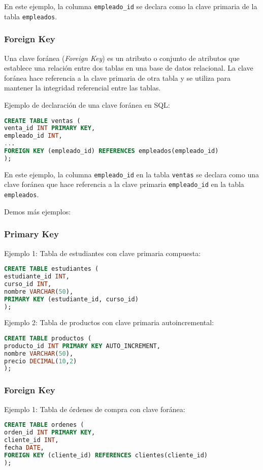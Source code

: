 \documentclass[executivepaper]{article}
\begin{document}
En este ejemplo, la columna \texttt{empleado\_id} se declara como la clave primaria de la tabla \texttt{empleados}.

\subsubsection*{Foreign Key}

Una clave foránea (\textit{Foreign Key}) es un atributo o conjunto de atributos que establece una relación entre dos tablas en una base de datos relacional. La clave foránea hace referencia a la clave primaria de otra tabla y se utiliza para mantener la integridad referencial entre las tablas.

Ejemplo de declaración de una clave foránea en SQL:

\begin{lstlisting}[language=SQL]
CREATE TABLE ventas (
venta_id INT PRIMARY KEY,
empleado_id INT,
...
FOREIGN KEY (empleado_id) REFERENCES empleados(empleado_id)
);
\end{lstlisting}

En este ejemplo, la columna \texttt{empleado\_id} en la tabla \texttt{ventas} se declara como una clave foránea que hace referencia a la clave primaria \texttt{empleado\_id} en la tabla \texttt{empleados}.

Demos más ejemplos:

\subsubsection*{Primary Key}

Ejemplo 1: Tabla de estudiantes con clave primaria compuesta:
\begin{lstlisting}[language=SQL]
CREATE TABLE estudiantes (
estudiante_id INT,
curso_id INT,
nombre VARCHAR(50),
PRIMARY KEY (estudiante_id, curso_id)
);
\end{lstlisting}

Ejemplo 2: Tabla de productos con clave primaria autoincremental:
\begin{lstlisting}[language=SQL]
CREATE TABLE productos (
producto_id INT PRIMARY KEY AUTO_INCREMENT,
nombre VARCHAR(50),
precio DECIMAL(10,2)
);
\end{lstlisting}

\subsubsection*{Foreign Key}

Ejemplo 1: Tabla de órdenes de compra con clave foránea:
\begin{lstlisting}[language=SQL]
CREATE TABLE ordenes (
orden_id INT PRIMARY KEY,
cliente_id INT,
fecha DATE,
FOREIGN KEY (cliente_id) REFERENCES clientes(cliente_id)
);
\end{lstlisting}
\end{document}
